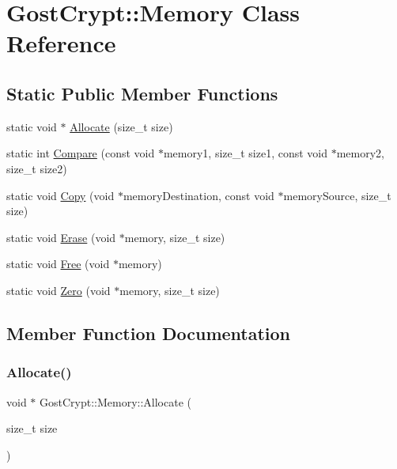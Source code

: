 \hypertarget{class_gost_crypt_1_1_memory}{}\section{Gost\+Crypt\+:\+:Memory Class Reference}
\label{class_gost_crypt_1_1_memory}
\subsection*{Static Public Member Functions}
\begin{DoxyCompactItemize}
\item 
static void $\ast$ \hyperlink{class_gost_crypt_1_1_memory_a196e1a2fb5de22c07aa8d1a496a70a31}{Allocate} (size\+\_\+t size)
\item 
static int \hyperlink{class_gost_crypt_1_1_memory_add555248df5a29723a32d7b73586719b}{Compare} (const void $\ast$memory1, size\+\_\+t size1, const void $\ast$memory2, size\+\_\+t size2)
\item 
static void \hyperlink{class_gost_crypt_1_1_memory_a29c1c6566655b07d93a5d4f5e85c7893}{Copy} (void $\ast$memory\+Destination, const void $\ast$memory\+Source, size\+\_\+t size)
\item 
static void \hyperlink{class_gost_crypt_1_1_memory_aa7963732365d53372dc1c72e2f187ca3}{Erase} (void $\ast$memory, size\+\_\+t size)
\item 
static void \hyperlink{class_gost_crypt_1_1_memory_ace99bf505971344cd9d483f42753ee03}{Free} (void $\ast$memory)
\item 
static void \hyperlink{class_gost_crypt_1_1_memory_a14050b8aaebcc91fc5636841e6d01585}{Zero} (void $\ast$memory, size\+\_\+t size)
\end{DoxyCompactItemize}


\subsection{Member Function Documentation}
\mbox{\label{class_gost_crypt_1_1_memory_a196e1a2fb5de22c07aa8d1a496a70a31}} 
\subsubsection{\texorpdfstring{Allocate()}{Allocate()}}
{\footnotesize\ttfamily void $\ast$ Gost\+Crypt\+::\+Memory\+::\+Allocate (\begin{DoxyParamCaption}\item[{size\+\_\+t}]{size }\end{DoxyParamCaption})\hspace{0.3cm}{\ttfamily [static]}}


